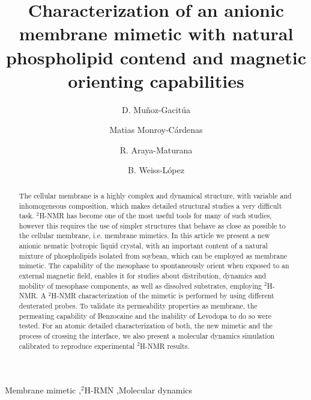 \documentclass[3p,preprint,review]{elsarticle}
\title{Characterization of an anionic membrane mimetic with natural phospholipid
	contend and magnetic
	orienting capabilities}
\author[1]{D. Muñoz-Gacitúa\corref{cor1}}
\author[2]{Matias Monroy-Cárdenas}
\author[2]{R. Araya-Maturana}
\author[1]{B. Weiss-López}
\begin{document}
	
	\begin{abstract}
		The cellular membrane is a highly complex and dynamical structure, with
		variable and inhomogeneous composition, which makes detailed structural studies
		a very difficult task. $^2$H-NMR has become one of the most useful tools for
		many of such studies, however this requires the use of simpler structures that
		behave as close as possible to the cellular membrane, i.e. membrane mimetics. In
		this article we present a new anionic nematic lyotropic liquid crystal, with an
		important content of a natural mixture of phospholipids isolated from soybean,
		which can be employed as membrane mimetic. The capability of the mesophase to
		spontaneously orient when exposed to an external magnetic field, enables it for
		studies about distribution, dynamics and mobility of mesophase components, as
		well as dissolved substrates, employing $^2$H-NMR. A $^2$H-NMR characterization
		of the mimetic is performed by using different deuterated probes. To validate
		its permeability properties as membrane, the permeating capability of Benzocaine
		and the inability of Levodopa to do so were tested. For an atomic detailed
		characterization of both, the new mimetic and the process of crossing the
		interface, we also present a molecular dynamics simulation calibrated to
		reproduce experimental $^2$H-NMR results.
	\end{abstract}
	
	\begin{keyword}
		Membrane mimetic \sep $^2$H-RMN \sep Molecular dynamics
	\end{keyword}
	
	\maketitle
	
	\renewcommand{\thefootnote}{\alph{footnote}}
\end{document}
